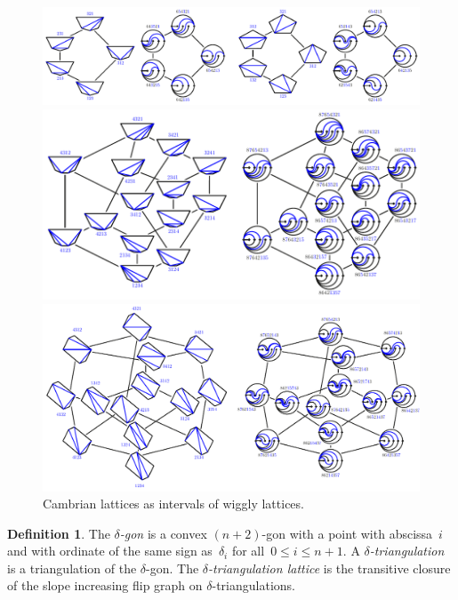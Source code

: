 \documentclass{amsart}
\theoremstyle{definition}
\newtheorem{definition}[theorem]{Definition}
\newcommand{\ssm}{\smallsetminus} %
\newcommand{\darkblue}{\color{darkblue}} %
\newcommand{\defn}[1]{\textsl{\darkblue #1}} %
\begin{document}
\begin{figure}
\centerline{\includegraphics[scale=1.1]{wigglyCambrian1}}
\vspace{-.3cm}
\centerline{\includegraphics[scale=1.1]{wigglyCambrian2}}
\vspace{-.5cm}
\centerline{\includegraphics[scale=1.1]{wigglyCambrian3}}
\caption{Cambrian lattices as intervals of wiggly lattices.}
\label{fig:wigglyCambrian}
\end{figure}

\begin{definition}
\label{def:CambrianTriangulations}
The \defn{$\delta$-gon} is a convex $(n+2)$-gon with a point with abscissa~$i$ and with ordinate of the same sign as~$\delta_i$  for all~$0 \le i \le n+1$.
A \defn{$\delta$-triangulation} is a triangulation of the $\delta$-gon.
The \defn{$\delta$-triangulation lattice} is the transitive closure of the slope increasing flip graph on $\delta$-triangulations.
\end{definition}
\end{document}
